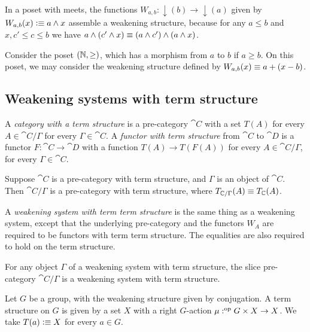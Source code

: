 \begin{eg}
In a poset with meets, the functions $W_{a,b}:{\downarrow}(b)\to{\downarrow}(a)$
given by $W_{a,b}(x)\vcentcolon\equiv a\land x$ assemble a weakening structure, because for
any $a\leq b$ and $x,c'\leq c\leq b$ we have $a\land(c'\land x)\equiv (a\land c')\land
(a\land x)$.  
\end{eg}

\begin{eg}
Consider the poset $(\mathbb{N},\geq)$, which has a morphism from $a$ to $b$ if $a\geq b$.
On this poset, we may consider the weakening structure defined by $W_{a,b}(x)\equiv
a+(x-b)$.
\end{eg}

\subsection{Weakening systems with term structure}
\begin{defn}
A \emph{category with a term structure} is a pre-category $\cat{C}$ with a set $T(A)$ for every
$A\in\cat{C}/\Gamma$ for every $\Gamma\in\cat{C}$. A \emph{functor with term structure} from $\cat{C}$ to $\cat{D}$
is a functor $F:\cat{C}\to\cat{D}$ with a function $T(A)\to T(F(A))$ for
every $A\in\cat{C}/\Gamma$, for every $\Gamma\in\cat{C}$.
\end{defn}

\begin{defn}
Suppose $\cat{C}$ is a pre-category with term structure, and $\Gamma$ is an object of $\cat{C}$. 
Then $\cat{C}/\Gamma$ is a pre-category with term structure, where $T_{\mathbb{C}/\Gamma}(A)\equiv T_\mathbb{C}(A)$.
\end{defn}

\begin{defn}
A \emph{weakening system with term term structure} is the same thing as a weakening system,
except that the underlying pre-category and the functors $W_A$ are required to
be functors with term term structure. The equalities are also required to hold on the term structure.
\end{defn}

\begin{cor}
For any object $\Gamma$ of a weakening system with term structure, the slice pre-category
$\cat{C}/\Gamma$ is a weakening system with term structure.
\end{cor}

\begin{eg}

Let $G$ be a group, with the weakening structure given by conjugation. A term
structure on $G$ is given by a set $X$ with a right $G$-action $\mu:^{\mathrm{op}} G\times X\to X$.
We take $T(a)\vcentcolon\equiv X$ for every $a\in G$.
\end{eg}


